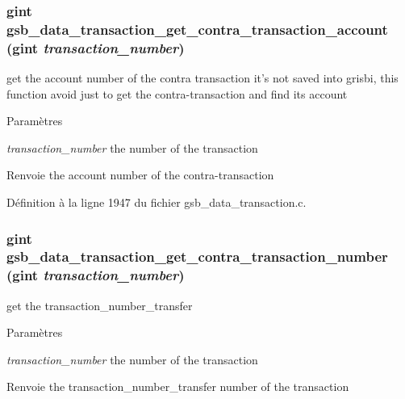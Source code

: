 \subsubsection[{gsb\_\-data\_\-transaction\_\-get\_\-contra\_\-transaction\_\-account}]{\setlength{\rightskip}{0pt plus 5cm}gint gsb\_\-data\_\-transaction\_\-get\_\-contra\_\-transaction\_\-account (gint {\em transaction\_\-number})}\label{gsb__data__transaction_8h_a655b6ad03fae3a20ff86adffc95a3ab3}
get the account number of the contra transaction it's not saved into grisbi, this function avoid just to get the contra-\/transaction and find its account


\begin{DoxyParams}{Paramètres}
\item[{\em transaction\_\-number}]the number of the transaction\end{DoxyParams}
\begin{DoxyReturn}{Renvoie}
the account number of the contra-\/transaction 
\end{DoxyReturn}


Définition à la ligne 1947 du fichier gsb\_\-data\_\-transaction.c.

\subsubsection[{gsb\_\-data\_\-transaction\_\-get\_\-contra\_\-transaction\_\-number}]{\setlength{\rightskip}{0pt plus 5cm}gint gsb\_\-data\_\-transaction\_\-get\_\-contra\_\-transaction\_\-number (gint {\em transaction\_\-number})}\label{gsb__data__transaction_8h_a4040925a3db49485b5a2b0a8ea19d2ee}
get the transaction\_\-number\_\-transfer


\begin{DoxyParams}{Paramètres}
\item[{\em transaction\_\-number}]the number of the transaction\end{DoxyParams}
\begin{DoxyReturn}{Renvoie}
the transaction\_\-number\_\-transfer number of the transaction 
\end{DoxyReturn}


